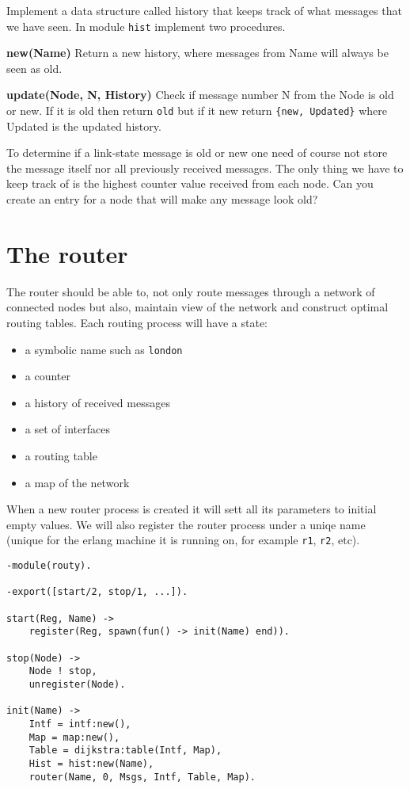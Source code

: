 \documentclass[a4paper, 11pt]{article}
\begin{document}
Implement a data structure called history that keeps track of what
messages that we have seen. In module {\tt hist} implement two
procedures.

{\bf new(Name)} Return a new history, where messages from Name will
always be seen as old.

{\bf update(Node, N, History)} Check if message number N from the Node is
old or new. If it is old then return {\tt old} but if it new return
{\tt \{new, Updated\}} where Updated is the updated history.

To determine if a link-state message is old or new one need of course
not store the message itself nor all previously received messages. The
only thing we have to keep track of is the highest counter value
received from each node. Can you create an entry for a node that will
make any message look old?

\section{The router}

The router should be able to, not only route messages through a
network of connected nodes but also, maintain view of the
network and construct optimal routing tables. Each
routing process will have a state:

\begin{itemize}
\item a symbolic name such as {\tt london}
\item a counter
\item a history of received messages
\item a set of interfaces
\item a routing table
\item a map of the network
\end{itemize}

\noindent When a new router process is created it will sett all its
parameters to initial empty values. We will also register the router
process under a uniqe name (unique for the erlang machine it is
running on, for example \verb+r1+, \verb+r2+, etc). 

\begin{verbatim}
-module(routy).

-export([start/2, stop/1, ...]).

start(Reg, Name) ->
    register(Reg, spawn(fun() -> init(Name) end)).
    
stop(Node) ->
    Node ! stop,
    unregister(Node).

init(Name) ->
    Intf = intf:new(),
    Map = map:new(),
    Table = dijkstra:table(Intf, Map),
    Hist = hist:new(Name),
    router(Name, 0, Msgs, Intf, Table, Map).
\end{verbatim}
\end{document}
